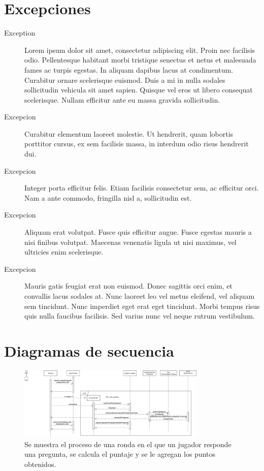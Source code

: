 \documentclass[titlepage,a4paper]{article}
\begin{document}
\section{Excepciones}\label{sec:excepciones}

\begin{description}
\item[Exception] Lorem ipsum dolor sit amet, consectetur adipiscing elit. Proin nec facilisis odio. Pellentesque habitant morbi tristique senectus et netus et malesuada fames ac turpis egestas. In aliquam dapibus lacus at condimentum. Curabitur ornare scelerisque euismod. Duis a mi in nulla sodales sollicitudin vehicula sit amet sapien. Quisque vel eros ut libero consequat scelerisque. Nullam efficitur ante eu massa gravida sollicitudin.
\item[Excepcion] Curabitur elementum laoreet molestie. Ut hendrerit, quam lobortis porttitor cursus, ex sem facilisis massa, in interdum odio risus hendrerit dui.
\item[Excepcion] Integer porta efficitur felis. Etiam facilisis consectetur sem, ac efficitur orci. Nam a ante commodo, fringilla nisl a, sollicitudin est.
\item[Excepcion] Aliquam erat volutpat. Fusce quis efficitur augue. Fusce egestas mauris a nisi finibus volutpat. Maecenas venenatis ligula ut nisi maximus, vel ultricies enim scelerisque.
\item[Excepcion] Mauris gatis feugiat erat non euismod. Donec sagittis orci enim, et convallis lacus sodales at. Nunc laoreet leo vel metus eleifend, vel aliquam sem tincidunt. Nunc imperdiet eget erat eget tincidunt. Morbi tempus risus quis nulla faucibus facilisis. Sed varius nunc vel neque rutrum vestibulum.
\end{description}

\section{Diagramas de secuencia}\label{sec:diagramasdesecuencia}

\begin{figure}[H]
\centering
\includegraphics[width=0.8\textwidth]{diagramaDeSecuencia.png}
\caption{\label{fig:seq01}Se muestra el proceso de una ronda en el que un jugador responde una pregunta, se calcula el puntaje y se le agregan los puntos obtenidos.}
\end{figure}
\end{document}
